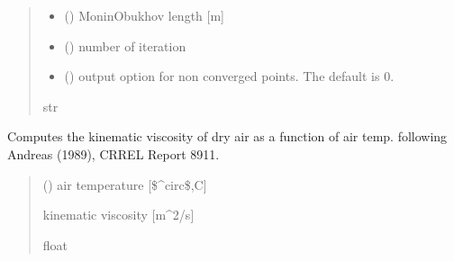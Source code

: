 \documentclass[letterpaper,10pt,english]{sphinxmanual}
\begin{document}
\begin{fulllineitems}
\begin{quote}
\begin{description}
\begin{itemize}
\item {} 
\sphinxAtStartPar
{} () \textendash{} Monin\sphinxhyphen{}Obukhov length          {[}m{]}

\item {} 
\sphinxAtStartPar
{} () \textendash{} number of iteration

\item {} 
\sphinxAtStartPar
{} (\sphinxstyleliteralemphasis{\sphinxupquote{, }}) \textendash{} output option for non converged points. The default is 0.

\end{itemize}

\sphinxAtStartPar
{}

\sphinxAtStartPar
str

\end{description}\end{quote}

\end{fulllineitems}


\begin{fulllineitems}
\label{\detokenize{users_guide:util_subs.visc_air}}
\pysigstartsignatures
{}
\pysigstopsignatures
\sphinxAtStartPar
Computes the kinematic viscosity of dry air as a function of air temp.
following Andreas (1989), CRREL Report 89\sphinxhyphen{}11.
\begin{quote}\begin{description}
\sphinxAtStartPar
{} () \textendash{} air temperature {[}\$\textasciicircum{}circ\$,C{]}

\sphinxAtStartPar
{} \textendash{} kinematic viscosity {[}m\textasciicircum{}2/s{]}

\sphinxAtStartPar
float

\end{description}\end{quote}

\end{fulllineitems}
\end{document}
